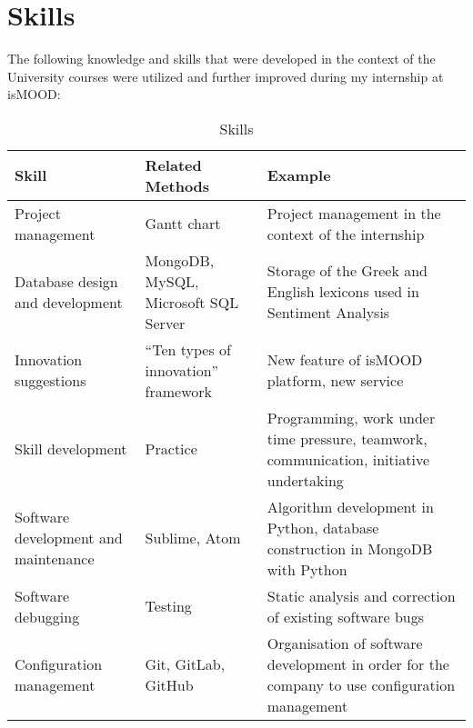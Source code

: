 \section{Skills}
\label{sec:skills}

The following knowledge and skills that were developed
in the context of the University courses were utilized
and further improved during my internship at isMOOD:

\begin{table}[ht]
\caption{\label{tab:skills}Skills}
\begin{tabularx}{\textwidth}{|X|X|X|}
 \hline
 \textbf{Skill} & \textbf{Related Methods} & \textbf{Example} \\ 
 \hline
 Project management & Gantt chart & Project management in the context of the internship \\
 \hline
 Database design and development & MongoDB, MySQL, Microsoft SQL Server & Storage of the Greek and English lexicons used in Sentiment Analysis \\ 
 \hline
 Innovation suggestions & ``Ten types of innovation'' framework & New feature of isMOOD platform, new service \\ 
 \hline
 Skill development & Practice & Programming, work under time pressure, teamwork, communication, initiative undertaking \\
 \hline
 Software development and maintenance & Sublime, Atom & Algorithm development in Python, database construction in MongoDB with Python \\
 \hline
 Software debugging & Testing & Static analysis and correction of existing software bugs \\
 \hline
 Configuration management & Git, GitLab, GitHub & Organisation of software development in order for the company to use configuration management \\
 \hline
\end{tabularx}
\end{table}
